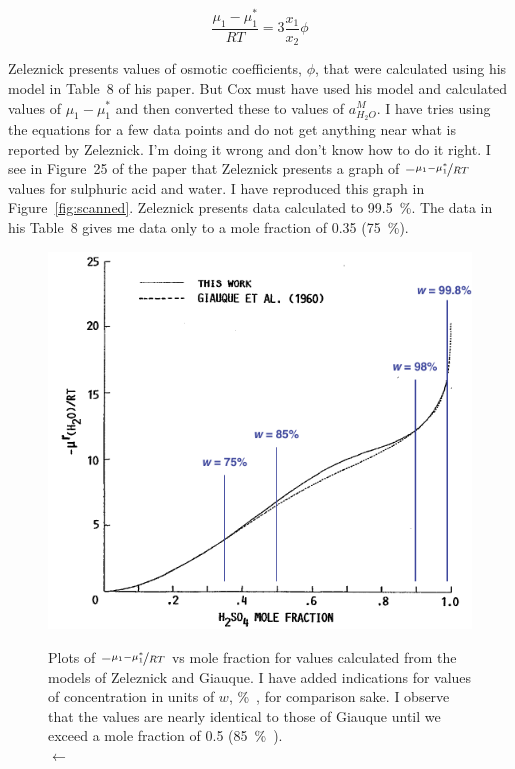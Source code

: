 \documentclass[]{tufte-handout}
\begin{document}
\begin{equation}
\frac{\mu_1 - \mu_1^*}{RT} = 3\frac{x_1}{x_2}\phi
\label{eq:zel11}\end{equation}

Zeleznick presents values of osmotic coefficients, $\phi$, that were calculated using his model in Table~8 of his paper. But Cox must have used his model and calculated values of $\mu_1 - \mu_1^*$ and then converted these to values of $a_{H_2O}^M$. I have tries using the equations for a few data points and do not get anything near what is reported by Zeleznick. I'm doing it wrong and don't know how to do it right. I see in Figure~25 of the paper that Zeleznick presents a graph of $-\nicefrac{\mu_1 - \mu_1^*}{RT}$ values for sulphuric acid and water. I have reproduced this graph in Figure~\vref{fig:scanned}. Zeleznick presents data calculated to \qty{99.5}{\percent}. The data in his Table~8 gives me data only to a mole fraction of 0.35 (\qty{75}{\percent}).

\begin{figure}
  \centering
  \caption{Plots of $-\nicefrac{\mu_1 - \mu_1^*}{RT}$ vs mole fraction  for values calculated from the models of Zeleznick and Giauque. I have added indications for values of concentration in units of $w$, \unit{\percent{}}, for comparison sake. I observe that the values are nearly identical to those of Giauque until we exceed a mole fraction of 0.5 (\qty{85}{\percent{}}).\\ $\longleftarrow$}
 \includegraphics[scale=1]{images/ZeleznickFig25B.pdf} 
  \label{fig:scanned}
\end{figure}
\end{document}
